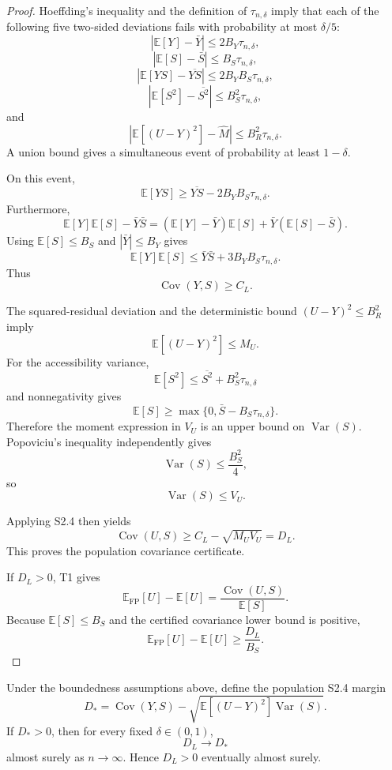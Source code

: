 \begin{proof}
Hoeffding's inequality and the definition of $\tau_{n,\delta}$ imply that each of the following five two-sided deviations fails with probability at most $\delta/5$:
\[
|\mathbb E[Y]-\bar Y|
\le
2B_Y\tau_{n,\delta},
\]
\[
|\mathbb E[S]-\bar S|
\le
B_S\tau_{n,\delta},
\]
\[
|\mathbb E[YS]-\overline{YS}|
\le
2B_YB_S\tau_{n,\delta},
\]
\[
|\mathbb E[S^2]-\overline{S^2}|
\le
B_S^2\tau_{n,\delta},
\]
and
\[
\left|
\mathbb E[(U-Y)^2]-\widehat M
\right|
\le
B_R^2\tau_{n,\delta}.
\]
A union bound gives a simultaneous event of probability at least $1-\delta$.

On this event,
\[
\mathbb E[YS]
\ge
\overline{YS}-2B_YB_S\tau_{n,\delta}.
\]
Furthermore,
\[
\mathbb E[Y]\mathbb E[S]-\bar Y\bar S
=
(\mathbb E[Y]-\bar Y)\mathbb E[S]
+
\bar Y(\mathbb E[S]-\bar S).
\]
Using $\mathbb E[S]\le B_S$ and $|\bar Y|\le B_Y$ gives
\[
\mathbb E[Y]\mathbb E[S]
\le
\bar Y\bar S+3B_YB_S\tau_{n,\delta}.
\]
Thus
\[
\operatorname{Cov}(Y,S)
\ge
C_L.
\]

The squared-residual deviation and the deterministic bound $(U-Y)^2\le B_R^2$ imply
\[
\mathbb E[(U-Y)^2]\le M_U.
\]
For the accessibility variance,
\[
\mathbb E[S^2]
\le
\overline{S^2}+B_S^2\tau_{n,\delta}
\]
and nonnegativity gives
\[
\mathbb E[S]
\ge
\max\{0,\bar S-B_S\tau_{n,\delta}\}.
\]
Therefore the moment expression in $V_U$ is an upper bound on $\operatorname{Var}(S)$. Popoviciu's inequality independently gives
\[
\operatorname{Var}(S)\le\frac{B_S^2}{4},
\]
so
\[
\operatorname{Var}(S)\le V_U.
\]

Applying S2.4 then yields
\[
\operatorname{Cov}(U,S)
\ge
C_L-\sqrt{M_UV_U}
=
D_L.
\]
This proves the population covariance certificate.

If $D_L>0$, T1 gives
\[
\mathbb E_{\mathrm{FP}}[U]-\mathbb E[U]
=
\frac{\operatorname{Cov}(U,S)}{\mathbb E[S]}.
\]
Because $\mathbb E[S]\le B_S$ and the certified covariance lower bound is positive,
\[
\mathbb E_{\mathrm{FP}}[U]-\mathbb E[U]
\ge
\frac{D_L}{B_S}.
\]
\end{proof}

\begin{corollary}[Consistency]
Under the boundedness assumptions above, define the population S2.4 margin
\[
D_*
=
\operatorname{Cov}(Y,S)
-
\sqrt{\mathbb E[(U-Y)^2]\operatorname{Var}(S)}.
\]
If $D_*>0$, then for every fixed $\delta\in(0,1)$,
\[
D_L\to D_*
\]
almost surely as $n\to\infty$. Hence $D_L>0$ eventually almost surely.
\end{corollary}

